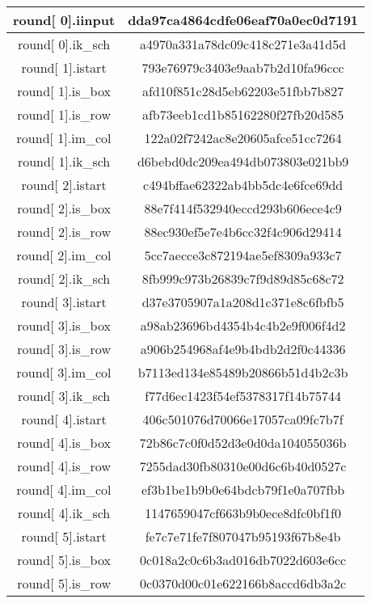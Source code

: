 \begin{center}
\begin{longtable}{|c|c|}
\hline
round[ 0].iinput&   dda97ca4864cdfe06eaf70a0ec0d7191\\
\hline
round[ 0].ik\_sch&   a4970a331a78dc09c418c271e3a41d5d\\
\hline
round[ 1].istart&   793e76979c3403e9aab7b2d10fa96ccc\\
\hline
round[ 1].is\_box&   afd10f851c28d5eb62203e51fbb7b827\\
\hline
round[ 1].is\_row&   afb73eeb1cd1b85162280f27fb20d585\\
\hline
round[ 1].im\_col&   122a02f7242ac8e20605afce51cc7264\\
\hline
round[ 1].ik\_sch&   d6bebd0dc209ea494db073803e021bb9\\
\hline
round[ 2].istart&   c494bffae62322ab4bb5dc4e6fce69dd\\
\hline
round[ 2].is\_box&   88e7f414f532940eccd293b606ece4c9\\
\hline
round[ 2].is\_row&   88ec930ef5e7e4b6cc32f4c906d29414\\
\hline
round[ 2].im\_col&   5cc7aecce3c872194ae5ef8309a933c7\\
\hline
round[ 2].ik\_sch&   8fb999c973b26839c7f9d89d85c68c72\\
\hline
round[ 3].istart&   d37e3705907a1a208d1c371e8c6fbfb5\\
\hline
round[ 3].is\_box&   a98ab23696bd4354b4c4b2e9f006f4d2\\
\hline
round[ 3].is\_row&   a906b254968af4e9b4bdb2d2f0c44336\\
\hline
round[ 3].im\_col&   b7113ed134e85489b20866b51d4b2c3b\\
\hline
round[ 3].ik\_sch&   f77d6ec1423f54ef5378317f14b75744\\
\hline
round[ 4].istart&   406c501076d70066e17057ca09fc7b7f\\
\hline
round[ 4].is\_box&   72b86c7c0f0d52d3e0d0da104055036b\\
\hline
round[ 4].is\_row&   7255dad30fb80310e00d6c6b40d0527c\\
\hline
round[ 4].im\_col&   ef3b1be1b9b0e64bdcb79f1e0a707fbb\\
\hline
round[ 4].ik\_sch&   1147659047cf663b9b0ece8dfc0bf1f0\\
\hline
round[ 5].istart&   fe7c7e71fe7f807047b95193f67b8e4b\\
\hline
round[ 5].is\_box&   0c018a2c0c6b3ad016db7022d603e6cc\\
\hline
round[ 5].is\_row&   0c0370d00c01e622166b8accd6db3a2c\\

\end{longtable}
\end{center}
